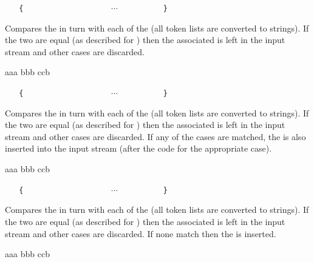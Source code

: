 \documentclass[oneside]{book}
\begin{document}
\begin{function}{\StrCase}
\begin{syntax}
 
~ ~ \verb|{|
~ ~ ~ ~  
~ ~ ~ ~  
~ ~ ~ ~ $\cdots$
~ ~ ~ ~  
~ ~ \verb|}|
\end{syntax}
Compares the  in turn with each
of the  (all token lists are converted to strings).
If the two are equal (as described for
) then the associated  is left in the
input stream and other cases are discarded.
\begin{demohigh}
\IgnoreSpacesOn
{} {
  {aaa} {}
  {bbb} {}
  {ccb} {}
}
\IgnoreSpacesOff
\end{demohigh}
\end{function}

\begin{function}{\StrCaseT}
\begin{syntax}
 
~ ~ \verb|{|
~ ~ ~ ~  
~ ~ ~ ~  
~ ~ ~ ~ $\cdots$
~ ~ ~ ~  
~ ~ \verb|}|
~ ~ 
\end{syntax}
Compares the  in turn with each
of the  (all token lists are converted to strings).
If the two are equal (as described for
) then the associated  is left in the
input stream and other cases are discarded. If any of the
cases are matched, the  is also inserted into the
input stream (after the code for the appropriate case).
\begin{demohigh}
\IgnoreSpacesOn
{} {
  {aaa} {\TlSet{}}
  {bbb} {\TlSet{}}
  {ccb} {\TlSet{}}
}{
  \Return{\TlUse\lTmpkTl}
}
\IgnoreSpacesOff
\end{demohigh}
\end{function}

\begin{function}{\StrCaseF}
\begin{syntax}
 
~ ~ \verb|{|
~ ~ ~ ~  
~ ~ ~ ~  
~ ~ ~ ~ $\cdots$
~ ~ ~ ~  
~ ~ \verb|}|
~ ~ 
\end{syntax}
Compares the  in turn with each
of the  (all token lists are converted to strings).
If the two are equal (as described for
) then the associated  is left in the
input stream and other cases are discarded. If none
match then the  is inserted.
\begin{demohigh}
\IgnoreSpacesOn
{} {
  {aaa} {}
  {bbb} {}
  {ccb} {}
}{
}
\IgnoreSpacesOff
\end{demohigh}
\end{function}
\end{document}
